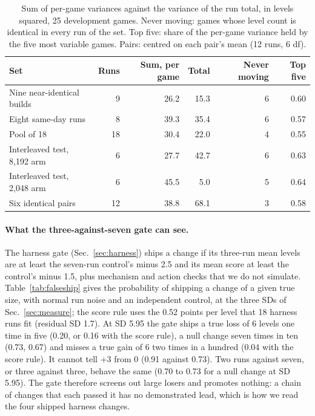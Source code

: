 \begin{table}[t]
\caption{Sum of per-game variances against the variance of the run total, in levels squared, 25 development games. Never moving: games whose level count is identical in every run of the set. Top five: share of the per-game variance held by the five most variable games. Pairs: centred on each pair's mean (12 runs, 6 df).}\label{tab:pergame} %
\centering\footnotesize
\begin{tabular}{@{}lrrrrr@{}}
\toprule
Set & Runs & Sum, per game & Total & Never moving & Top five \\
\midrule
Nine near-identical builds & 9 & 26.2 & 15.3 & 6 & 0.60 \\
Eight same-day runs & 8 & 39.3 & 35.4 & 6 & 0.57 \\
Pool of 18 & 18 & 30.4 & 22.0 & 4 & 0.55 \\
Interleaved test, 8,192 arm & 6 & 27.7 & 42.7 & 6 & 0.63 \\
Interleaved test, 2,048 arm & 6 & 45.5 & 5.0 & 5 & 0.64 \\
Six identical pairs & 12 & 38.8 & 68.1 & 3 & 0.58 \\
\bottomrule
\end{tabular}
\end{table}

\paragraph{What the three-against-seven gate can see.}
The harness gate (Sec.~\ref{sec:harness}) ships a change if its three-run mean levels are at least the seven-run control's minus 2.5 and its mean score at least the control's minus 1.5, plus mechanism and action checks that we do not simulate. Table~\ref{tab:falseship} gives the probability of shipping a change of a given true size, with normal run noise and an independent control, at the three SDs of Sec.~\ref{sec:measure}; the score rule uses the 0.52 points per level that 18 harness runs fit (residual SD 1.7). %
At SD 5.95 the gate ships a true loss of 6 levels one time in five (0.20, or 0.16 with the score rule), a null change seven times in ten (0.73, 0.67) and misses a true gain of 6 two times in a hundred (0.04 with the score rule). It cannot tell $+3$ from 0 (0.91 against 0.73). Two runs against seven, or three against three, behave the same (0.70 to 0.73 for a null change at SD 5.95).
The gate therefore screens out large losers and promotes nothing: a chain of changes that each passed it has no demonstrated lead, which is how we read the four shipped harness changes. %

